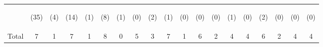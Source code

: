 \begin{tabular}{lcccccccccccccccccc}
 & \begin{footnotesize}(35)\end{footnotesize} & \begin{footnotesize}(4)\end{footnotesize} & \begin{footnotesize}(14)\end{footnotesize} & \begin{footnotesize}(1)\end{footnotesize} & \begin{footnotesize}(8)\end{footnotesize} & \begin{footnotesize}(1)\end{footnotesize} & \begin{footnotesize}(0)\end{footnotesize} & \begin{footnotesize}(2)\end{footnotesize} & \begin{footnotesize}(1)\end{footnotesize} & \begin{footnotesize}(0)\end{footnotesize} & \begin{footnotesize}(0)\end{footnotesize} & \begin{footnotesize}(0)\end{footnotesize} & \begin{footnotesize}(1)\end{footnotesize} & \begin{footnotesize}(0)\end{footnotesize} & \begin{footnotesize}(2)\end{footnotesize} & \begin{footnotesize}(0)\end{footnotesize} & \begin{footnotesize}(0)\end{footnotesize} & \begin{footnotesize}(0)\end{footnotesize}\\
\noalign{\smallskip}Total & 7 & 1 & 7 & 1 & 8 & 0 & 5 & 3 & 7 & 1 & 6 & 2 & 4 & 4 & 6 & 2 & 4 & 4\\

\end{tabular}
